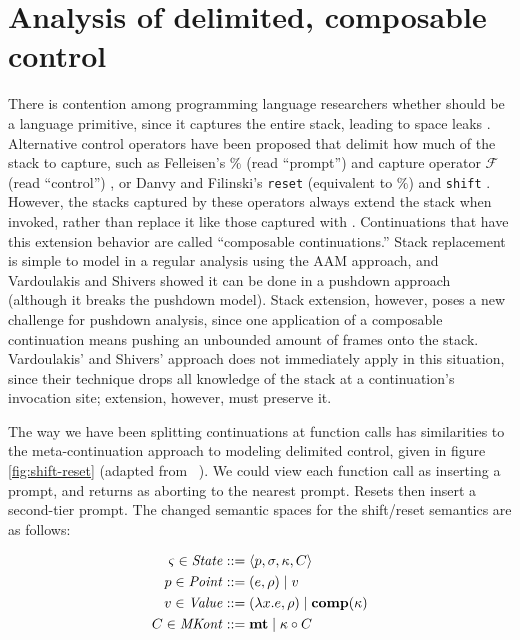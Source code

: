 \documentclass{llncs}
\newcommand{\Scribtexttt}[1]{{\texttt{#1}}}
\newcommand{\SColorize}[2]{\color{#1}{#2}}
\newcommand{\inColor}[2]{{\Scribtexttt{\SColorize{#1}{#2}}}}
\newcommand{\rackett}[1]{\inColor{black}{#1}}
\begin{document}
\section{Analysis of delimited, composable control}
\label{sec:sr}

There is contention among programming language researchers whether
\rackett{call/cc} should be a language primitive, since it captures
the entire stack, leading to space leaks
\citep{ianjohnson:kiselyov:against-callcc}. Alternative control
operators have been proposed that delimit how much of the stack to
capture, such as Felleisen's $\%$ (read ``prompt'') and capture
operator ${\mathcal F}$ (read ``control'')
\citep{ianjohnson:felleisen:control:1988}, or Danvy and Filinski's
\texttt{reset} (equivalent to $\%$) and \texttt{shift}
\citep{ianjohnson:danvy:filinski:delim:1990}. However, the stacks
captured by these operators always extend the stack when invoked,
rather than replace it like those captured with
\rackett{call/cc}. Continuations that have this extension behavior are
called ``composable continuations.'' Stack replacement is simple to
model in a regular analysis using the AAM approach, and Vardoulakis
and Shivers showed it can be done in a pushdown approach (although it
breaks the pushdown model). Stack extension, however, poses a new
challenge for pushdown analysis, since one application of a composable
continuation means pushing an unbounded amount of frames onto the
stack. Vardoulakis' and Shivers' approach does not immediately apply
in this situation, since their technique drops all knowledge of the
stack at a continuation's invocation site; extension, however, must
preserve it.

The way we have been splitting continuations at function calls has
similarities to the meta-continuation approach to modeling delimited
control, given in figure \ref{fig:shift-reset} (adapted from
~\citep{ianjohnson:Biernacki2006274}). We could view each function
call as inserting a prompt, and returns as aborting to the nearest
prompt. Resets then insert a second-tier prompt. The changed semantic
spaces for the shift/reset semantics are as follows:

\begin{align*}
  \varsigma \in \mathit{State} &::= \langle p, \sigma, \kappa, C \rangle \\
  p \in \mathit{Point} &::= (e, \rho) \mid v \\
  v \in \mathit{Value} &::= (\lambda{} x. e, \rho) \mid \mathbf{comp}(\kappa) \\
  C \in \mathit{MKont} &::= \mathbf{mt} \mid \kappa\circ C
\end{align*}
\end{document}
